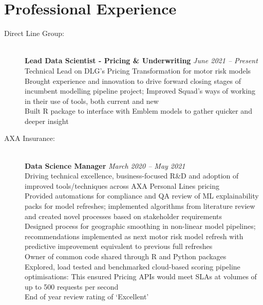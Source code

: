 \documentclass[11pt]{article}
\begin{document}
\section*{Professional Experience}
\begin{description}

\item[Direct Line Group:] \hspace{1mm}\\
\textbf{Lead Data Scientist - Pricing \& Underwriting} \emph{June 2021 -- Present} \\
\textbullet \quad Technical Lead on DLG's Pricing Transformation for motor risk models\\
\textbullet \quad Brought experience and innovation to drive forward closing stages of incumbent modelling pipeline project; Improved Squad's ways of working in their use of tools, both current and new\\
\textbullet \quad Built R package to interface with Emblem models to gather quicker and deeper insight\\

\item[AXA Insurance:] \hspace{1mm} \\
\textbf{Data Science Manager} \emph{March 2020 -- May 2021}\\
\textbullet \quad Driving technical excellence, business-focused R\&D and adoption of improved tools/techniques across AXA Personal Lines pricing \\
\textbullet \quad Provided automations for compliance and QA review of ML explainability packs for model refreshes; implemented algorithms from literature review and created novel processes based on stakeholder requirements \\
\textbullet \quad Designed process for geographic smoothing in non-linear model pipelines; recommendations implemented as next motor risk model refresh with predictive improvement equivalent to previous full refreshes\\
\textbullet \quad Owner of common code shared through R and Python packages \\
\textbullet \quad Explored, load tested and benchmarked cloud-based scoring pipeline optimisations: This ensured Pricing APIs would meet SLAs at volumes of up to 500 requests per second \\
\textbullet \quad End of year review rating of `Excellent'


\end{description}
\end{document}
